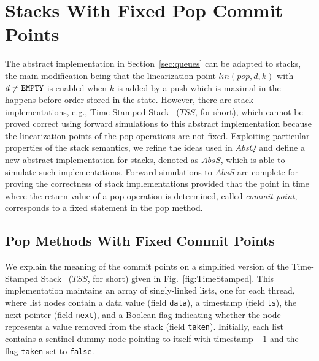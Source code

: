 \vspace{-3.5mm}
\section{Stacks With Fixed Pop Commit Points}\label{sec:stacks}
\vspace{-1.5mm}
The abstract implementation in Section~\ref{sec:queues} can be adapted to stacks, the main modification being that the linearization point $lin(pop,d,k)$ with $d\neq{\tt EMPTY}$ is enabled when $k$ is added by a push which is maximal in the happens-before order stored in the state. However, there are stack implementations, e.g., Time-Stamped Stack~\cite{DBLP:conf/popl/DoddsHK15} ($\mathit{TSS}$, for short), which cannot be proved correct using forward simulations to this abstract implementation because the linearization points of the pop operations are not fixed.
Exploiting particular properties of the stack semantics, we refine the ideas used in $AbsQ$ and define
a new abstract implementation for stacks, denoted as $AbsS$, which is able to simulate such implementations. Forward simulations to $AbsS$ are complete for proving the correctness of stack implementations provided that the point in time where the return value of a pop operation is determined, called \emph{commit point}, corresponds to a fixed statement in the pop method.

\vspace{-3.5mm}
\subsection{Pop Methods With Fixed Commit Points}
\vspace{-1mm}

We explain the meaning of the commit points on a simplified version of the Time-Stamped Stack~\cite{DBLP:conf/popl/DoddsHK15} ($\mathit{TSS}$, for short) given in Fig.~\ref{fig:TimeStamped}. This  implementation maintains an array of singly-linked lists, one for each thread, where list nodes contain a data value (field {\tt data}), a timestamp (field {\tt ts}), the next pointer (field {\tt next}), and a Boolean flag indicating whether the node represents a value removed from the stack (field {\tt taken}). Initially, each list contains a sentinel dummy node pointing to itself with timestamp $-1$ and the flag {\tt taken} set to {\tt false}.


